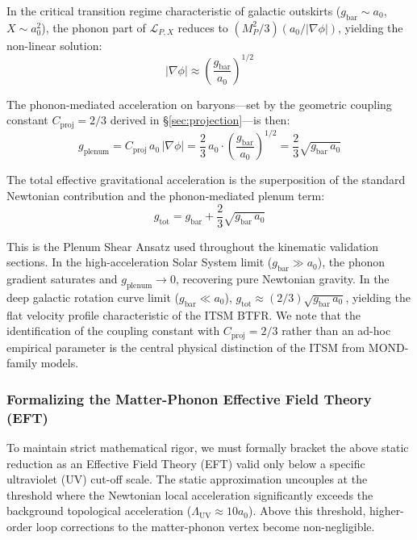 \documentclass[aps,prd,10pt,twocolumn,superscriptaddress,nofootinbib]{revtex4-2}
\begin{document}
In the critical transition regime characteristic of galactic outskirts ($g_{\text{bar}} \sim a_0$, $X \sim a_0^2$), the phonon part of $\mathcal{L}_{P,X}$ reduces to $(M_P^2/3)(a_0/|\nabla\phi|)$, yielding the non-linear solution:
\begin{equation}
|\nabla\phi| \approx \left(\frac{g_{\text{bar}}}{a_0}\right)^{1/2}
\end{equation}

The phonon-mediated acceleration on baryons---set by the geometric coupling constant $C_{\text{proj}} = 2/3$ derived in \S\ref{sec:projection}---is then:
\begin{equation}
g_{\text{plenum}} = C_{\text{proj}}\,a_0\,|\nabla\phi| = \frac{2}{3}\,a_0 \cdot \left(\frac{g_{\text{bar}}}{a_0}\right)^{1/2} = \frac{2}{3}\sqrt{g_{\text{bar}}\,a_0}
\end{equation}

The total effective gravitational acceleration is the superposition of the standard Newtonian contribution and the phonon-mediated plenum term:
\begin{equation}
g_{\text{tot}} = g_{\text{bar}} + \frac{2}{3}\sqrt{g_{\text{bar}}\,a_0}
\end{equation}

This is the Plenum Shear Ansatz used throughout the kinematic validation sections. In the high-acceleration Solar System limit ($g_{\text{bar}} \gg a_0$), the phonon gradient saturates and $g_{\text{plenum}} \to 0$, recovering pure Newtonian gravity. In the deep galactic rotation curve limit ($g_{\text{bar}} \ll a_0$), $g_{\text{tot}} \approx (2/3)\sqrt{g_{\text{bar}}\,a_0}$, yielding the flat velocity profile characteristic of the ITSM BTFR. We note that the identification of the coupling constant with $C_{\text{proj}} = 2/3$ rather than an ad-hoc empirical parameter is the central physical distinction of the ITSM from MOND-family models. 

\subsubsection{Formalizing the Matter-Phonon Effective Field Theory (EFT)}
To maintain strict mathematical rigor, we must formally bracket the above static reduction as an Effective Field Theory (EFT) valid only below a specific ultraviolet (UV) cut-off scale. The static approximation uncouples at the threshold where the Newtonian local acceleration significantly exceeds the background topological acceleration ($\Lambda_{\text{UV}} \approx 10 a_0$). Above this threshold, higher-order loop corrections to the matter-phonon vertex become non-negligible.
\end{document}
